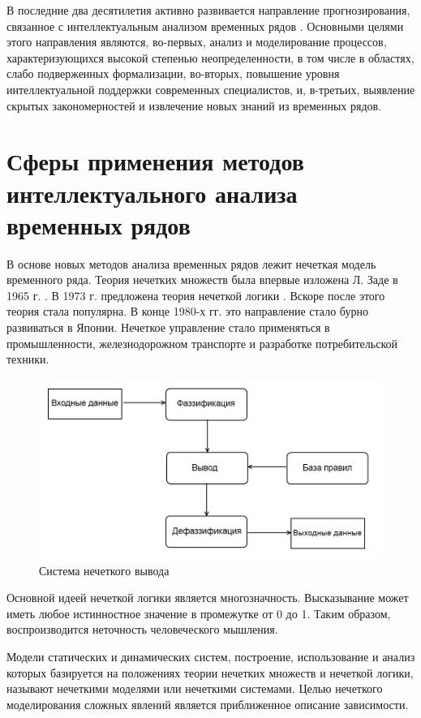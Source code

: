 В последние два десятилетия активно развивается направление прогнозирования, связанное с интеллектуальным анализом временных рядов \cite{Yarushkina2010}. 
Основными целями этого направления являются, во-первых, анализ и моделирование процессов, характеризующихся высокой степенью неопределенности, 
в том числе в областях, слабо подверженных формализации, 
во-вторых, повышение уровня интеллектуальной поддержки современных специалистов, 
и, в-третьих, выявление скрытых закономерностей и извлечение новых знаний из временных рядов. 

\section{Сферы применения методов интеллектуального анализа временных рядов}

В основе новых методов анализа временных рядов лежит нечеткая модель временного ряда. 
Теория нечетких множеств была впервые изложена Л. Заде в 1965 г. \cite{zadeh1965fuzzy}. 
В 1973 г. предложена теория нечеткой логики \cite{Zadeh1973}. 
Вскоре после этого теория стала популярна. 
В конце 1980-х гг. это направление стало бурно развиваться в Японии. 
Нечеткое управление стало применяться в промышленности, железнодорожном транспорте и разработке потребительской техники.

\begin{figure}[h]
    \includegraphics{images/fuzzy_engine.png}
    \caption{Система нечеткого вывода}
    \label{figure:fuzzy_engine}
\end{figure}

Основной идеей нечеткой логики является многозначность. 
Высказывание может иметь любое истинностное значение в промежутке от 0 до 1. 
Таким образом, воспроизводится неточность человеческого мышления.

Модели статических и динамических систем, построение, 
использование и анализ которых базируется на положениях теории нечетких множеств и нечеткой логики, называют нечеткими моделями или нечеткими системами. 
Целью нечеткого моделирования сложных явлений является приближенное описание зависимости. 


